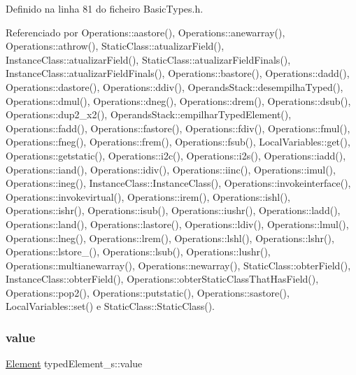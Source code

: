 Definido na linha 81 do ficheiro Basic\+Types.\+h.



Referenciado por Operations\+::aastore(), Operations\+::anewarray(), Operations\+::athrow(), Static\+Class\+::atualizar\+Field(), Instance\+Class\+::atualizar\+Field(), Static\+Class\+::atualizar\+Field\+Finals(), Instance\+Class\+::atualizar\+Field\+Finals(), Operations\+::bastore(), Operations\+::dadd(), Operations\+::dastore(), Operations\+::ddiv(), Operands\+Stack\+::desempilha\+Typed(), Operations\+::dmul(), Operations\+::dneg(), Operations\+::drem(), Operations\+::dsub(), Operations\+::dup2\+\_\+x2(), Operands\+Stack\+::empilhar\+Typed\+Element(), Operations\+::fadd(), Operations\+::fastore(), Operations\+::fdiv(), Operations\+::fmul(), Operations\+::fneg(), Operations\+::frem(), Operations\+::fsub(), Local\+Variables\+::get(), Operations\+::getstatic(), Operations\+::i2c(), Operations\+::i2s(), Operations\+::iadd(), Operations\+::iand(), Operations\+::idiv(), Operations\+::iinc(), Operations\+::imul(), Operations\+::ineg(), Instance\+Class\+::\+Instance\+Class(), Operations\+::invokeinterface(), Operations\+::invokevirtual(), Operations\+::irem(), Operations\+::ishl(), Operations\+::ishr(), Operations\+::isub(), Operations\+::iushr(), Operations\+::ladd(), Operations\+::land(), Operations\+::lastore(), Operations\+::ldiv(), Operations\+::lmul(), Operations\+::lneg(), Operations\+::lrem(), Operations\+::lshl(), Operations\+::lshr(), Operations\+::lstore\+\_(), Operations\+::lsub(), Operations\+::lushr(), Operations\+::multianewarray(), Operations\+::newarray(), Static\+Class\+::obter\+Field(), Instance\+Class\+::obter\+Field(), Operations\+::obter\+Static\+Class\+That\+Has\+Field(), Operations\+::pop2(), Operations\+::putstatic(), Operations\+::sastore(), Local\+Variables\+::set() e Static\+Class\+::\+Static\+Class().

\mbox{\label{structtypedElement__s_a31beb2ade81f8acacfc312bba3ab2086}} 
\subsubsection{\texorpdfstring{value}{value}}
{\footnotesize\ttfamily \hyperlink{BasicTypes_8h_a8132f4f0515064141e31e606660df561}{Element} typed\+Element\+\_\+s\+::value}



